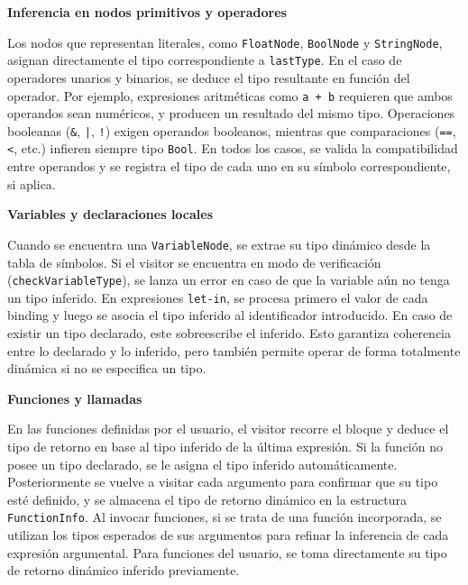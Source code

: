 \documentclass{llncs}
\begin{document}
	\vspace{1em}
	\noindent \textbf{Inferencia en nodos primitivos y operadores}

	Los nodos que representan literales, como \texttt{FloatNode}, \texttt{BoolNode} y \texttt{StringNode}, asignan directamente el tipo correspondiente a \texttt{lastType}. En el caso de operadores unarios y binarios, se deduce el tipo resultante en función del operador. Por ejemplo, expresiones aritméticas como \texttt{a + b} requieren que ambos operandos sean numéricos, y producen un resultado del mismo tipo. Operaciones booleanas (\texttt{\&}, \texttt{|}, \texttt{!}) exigen operandos booleanos, mientras que comparaciones (\texttt{==}, \texttt{<}, etc.) infieren siempre tipo \texttt{Bool}. En todos los casos, se valida la compatibilidad entre operandos y se registra el tipo de cada uno en su símbolo correspondiente, si aplica.

	\vspace{1em}
	\noindent \textbf{Variables y declaraciones locales}

	Cuando se encuentra una \texttt{VariableNode}, se extrae su tipo dinámico desde la tabla de símbolos. Si el visitor se encuentra en modo de verificación (\texttt{checkVariableType}), se lanza un error en caso de que la variable aún no tenga un tipo inferido. En expresiones \texttt{let-in}, se procesa primero el valor de cada binding y luego se asocia el tipo inferido al identificador introducido. En caso de existir un tipo declarado, este sobreescribe el inferido. Esto garantiza coherencia entre lo declarado y lo inferido, pero también permite operar de forma totalmente dinámica si no se especifica un tipo.

	\vspace{1em}
	\noindent \textbf{Funciones y llamadas}

	En las funciones definidas por el usuario, el visitor recorre el bloque y deduce el tipo de retorno en base al tipo inferido de la última expresión. Si la función no posee un tipo declarado, se le asigna el tipo inferido automáticamente. Posteriormente se vuelve a visitar cada argumento para confirmar que su tipo esté definido, y se almacena el tipo de retorno dinámico en la estructura \texttt{FunctionInfo}. Al invocar funciones, si se trata de una función incorporada, se utilizan los tipos esperados de sus argumentos para refinar la inferencia de cada expresión argumental. Para funciones del usuario, se toma directamente su tipo de retorno dinámico inferido previamente.
\end{document}

